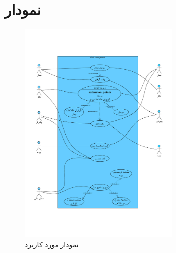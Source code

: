 \documentclass[a4paper,12pt]{report}
\begin{document}
	\section{
		نمودار 
	}\label{sec8}
	\vspace{-2cm}
	\begin{figure}[!h]
		\label{fig1:sec8}
		\begin{center}
			\includegraphics[width=0.7\textwidth]{useCase.pdf}
			\caption{نمودار مورد کاربرد}
		\end{center}
	\end{figure}
\end{document}
